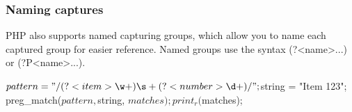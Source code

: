\documentclass{report}
\begin{document}
 \bigbreak \noindent 
 \subsubsection{Naming captures}
 \bigbreak \noindent 
 PHP also supports named capturing groups, which allow you to name each captured group for easier reference. Named groups use the syntax (?<name>...) or (?P<name>...).
 \bigbreak \noindent 
 \begin{phpcode}
     $pattern = "/(?<item>\w+)\s+(?<number>\d+)/";
     $string = "Item 123";
     preg_match($pattern, $string, $matches);
     print_r($matches);
 \end{phpcode}












    
\end{document}
